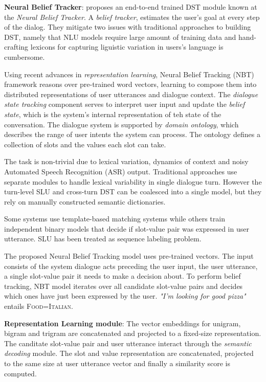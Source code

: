 \documentclass[12pt,a4paper]{article}
\begin{document}
\medskip \noindent \textbf{Neural Belief Tracker}: \citeauthor{Mrksic2016NeuralBT} proposes an end-to-end trained DST module known at the \textit{Neural Belief Tracker}. A \textit{belief tracker}, estimates the user's goal at every step of the dialog. They mitigate two issues with traditional approaches to building DST, namely that NLU models require large amount of training data and hand-crafting lexicons for capturing liguistic variation in users's language is cumbersome.

Using recent advances in \textit{representation learning}, Neural Belief Tracking (NBT) framework reasons over pre-trained word vectors, learning to compose them into distributed representations of user utterances and dialogue context. The \textit{dialogue state tracking} component serves to interpret user input and update the \textit{belief state}, which is the system's internal representation of teh state of the conversation. The dialogue system is supported by \textit{domain ontology}, which describes the range of user intents the system can process. The ontology defines a collection of slots and the values each slot can take.

The task is non-trivial due to lexical variation, dynamics of context and noisy Automated Speech Recognition (ASR) output. Traditional approaches use separate modules to handle lexical variability in single dialogue turn. However the turn-level SLU and cross-turn DST can be coalesced into a single model, but they rely on manually constructed semantic dictionaries.

Some systems use template-based matching systems while others train independent binary models that decide if slot-value pair was expressed in user utterance. SLU has been treated as sequence labeling problem.

The proposed Neural Belief Tracking model uses pre-trained vectors. The input consists of the system dialogue acts preceding the user input, the user utterance, a single slot-value pair it needs to make a decision about. To perform belief tracking, NBT model iterates over all candidate slot-value pairs and decides which ones have just been expressed by the user. \textit{"I'm looking for good pizza"} entails \textsc{Food=Italian}.

\smallskip \noindent \textbf{Representation Learning module}:
The vector embeddings for unigram, bigram and trigram are concatenated and projected to a fixed-size representation. The canditate slot-value pair and user utterance interact through the \textit{semantic decoding} module. The slot and value representation are concatenated, projected to the same size at user utterance vector and finally a similarity score is computed.
\end{document}
